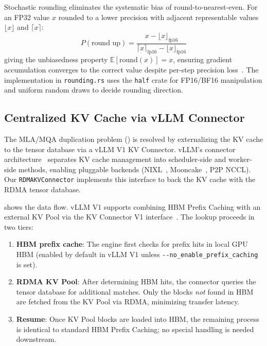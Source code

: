 \documentclass[11pt,letterpaper]{article}
\theoremstyle{definition}
\begin{document}
Stochastic rounding eliminates the systematic bias of round-to-nearest-even. For an FP32 value $x$ rounded to a lower precision with adjacent representable values $\lfloor x \rfloor$ and $\lceil x \rceil$:
\begin{equation}
\label{eq:stochastic-round}
    P(\text{round up}) = \frac{x - \lfloor x \rfloor_{\text{fp16}}}{\lceil x \rceil_{\text{fp16}} - \lfloor x \rfloor_{\text{fp16}}}
\end{equation}
giving the unbiasedness property $\mathbb{E}[\text{round}(x)] = x$, ensuring gradient accumulation converges to the correct value despite per-step precision loss~\cite{micikevicius2018mixed}. The implementation in \texttt{rounding.rs} uses the \texttt{half} crate for FP16/BF16 manipulation and uniform random draws to decide rounding direction.

\subsection{Centralized KV Cache via vLLM Connector}
\label{sec:kv-connector}

The MLA/MQA duplication problem () is resolved by externalizing the KV cache to the tensor database via a vLLM V1 KV Connector. vLLM's connector architecture~\cite{vllm-kv-pool} separates KV cache management into scheduler-side and worker-side methods, enabling pluggable backends (NIXL~\cite{nixl}, Mooncake~\cite{mooncake2024}, P2P NCCL). Our \texttt{RDMAKVConnector} implements this interface to back the KV cache with the RDMA tensor database.

 shows the data flow. vLLM V1 supports combining HBM Prefix Caching with an external KV Pool via the KV Connector V1 interface~\cite{vllm-kv-pool}. The lookup proceeds in two tiers:
\begin{enumerate}
    \item \textbf{HBM prefix cache}: The engine first checks for prefix hits in local GPU HBM (enabled by default in vLLM V1 unless \texttt{-{}-no\_enable\_prefix\_caching} is set).
    \item \textbf{RDMA KV Pool}: After determining HBM hits, the connector queries the tensor database for additional matches. Only the blocks \emph{not} found in HBM are fetched from the KV Pool via RDMA, minimizing transfer latency.
    \item \textbf{Resume}: Once KV Pool blocks are loaded into HBM, the remaining process is identical to standard HBM Prefix Caching; no special handling is needed downstream.
\end{enumerate}
\end{document}
